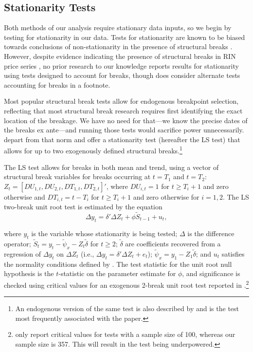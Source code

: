 \documentclass[11pt]{article}
\begin{document}
\subsection{Stationarity Tests}

Both methods of our analysis require stationary data inputs, so we begin by testing for stationarity in our data. Tests for stationarity are known to be biased towards conclusions of non-stationarity in the presence of structural breaks \citep{Perron1989}. However, despite evidence indicating the presence of structural breaks in RIN price series \citep{Mason2016}, no prior research to our knowledge reports results for stationarity using tests designed to account for breaks, though \cite{Lade2018a} does consider alternate tests accounting for breaks in a footnote. 

Most popular structural break tests allow for endogenous breakpoint selection, reflecting that most structural break research requires first identifying the exact location of the breakage. We have no need for that---we know the precise dates of the breaks ex ante---and running those tests would sacrifice power unnecessarily. \cite{Lee2003} depart from that norm and offer a stationarity test (hereafter the LS test) that allows for up to two exogenously defined structural breaks.\footnote{An endogenous version of the same test is also described by \cite{Lee2003} and is the test most frequently associated with the paper.}

The LS test allows for breaks in both mean and trend, using a vector of structural break variables for breaks occurring at $t=T_1$ and $t=T_2$:  $Z_t=[DU_{1,t},DU_{2,t},DT_{1,t},DT_{2,t}]'$, where $DU_{i,t}=1$ for $t\ge T_i+1$ and zero otherwise and $DT_{i,t}=t-T_i$ for $t\ge T_i+1$ and zero otherwise for $i=1,2$. The LS two-break unit root test is estimated by the equation
\begin{equation}
\Delta y_t=\delta'\Delta Z_t+\phi \tilde{S}_{t-1}+u_t,
\end{equation}

\noindent where $y_t$ is the variable whose stationarity is being tested; $\Delta$ is the difference operator; $\tilde{S}_t=y_t-\tilde{\psi}_x-Z_t\tilde{\delta}$ for $t\ge2$; $\tilde{\delta}$ are coefficients recovered from a regression of $\Delta y_t$ on $\Delta Z_t$ (i.e., $\Delta y_t=\delta'\Delta Z_t+e_t$);  $\tilde{\psi}_x=y_1-Z_1\tilde{\delta}$; and $u_t$ satisfies the normality conditions defined by \citet[p. 336]{Phillips1988}. The test statistic for the unit root null hypothesis is the $t$-statistic on the parameter estimate for $\phi$, and significance is checked using critical values for an exogenous 2-break unit root test reported in \cite{Lee2003}.\footnote{\cite{Lee2003} only report critical values for tests with a sample size of 100, whereas our sample size is 357. This will result in the test being underpowered.}
\end{document}
